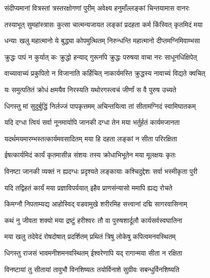 
\twolineshloka
{संदीप्यमानां वित्रस्तां त्रस्तरक्षोगणां पुरीम्}
{अवेक्ष्य हनुमाँल्लङ्कां चिन्तयामास वानरः} %

\twolineshloka
{तस्याभूत् सुमहांस्त्रासः कुत्सा चात्मन्यजायत}
{लङ्कां प्रदहता कर्म किंस्वित् कृतमिदं मया} %

\twolineshloka
{धन्याः खलु महात्मानो ये बुद्ध्या कोपमुत्थितम्}
{निरुन्धन्ति महात्मानो दीप्तमग्निमिवाम्भसा} %

\twolineshloka
{क्रुद्धः पापं न कुर्यात् कः क्रुद्धो हन्याद् गुरूनपि}
{क्रुद्धः परुषया वाचा नरः साधूनधिक्षिपेत्} %

\twolineshloka
{वाच्यावाच्यं प्रकुपितो न विजानाति कर्हिचित्}
{नाकार्यमस्ति क्रुद्धस्य नावाच्यं विद्यते क्वचित्} %

\twolineshloka
{यः समुत्पतितं क्रोधं क्षमयैव निरस्यति}
{यथोरगस्त्वचं जीर्णां स वै पुरुष उच्यते} %

\twolineshloka
{धिगस्तु मां सुदुर्बुद्धिं निर्लज्जं पापकृत्तमम्}
{अचिन्तयित्वा तां सीतामग्निदं स्वामिघातकम्} %

\twolineshloka
{यदि दग्धा त्वियं सर्वा नूनमार्यापि जानकी}
{दग्धा तेन मया भर्तुर्हतं कार्यमजानता} %

\twolineshloka
{यदर्थमयमारम्भस्तत्कार्यमवसादितम्}
{मया हि दहता लङ्कां न सीता परिरक्षिता} %

\twolineshloka
{ईषत्कार्यमिदं कार्यं कृतमासीन्न संशयः}
{तस्य क्रोधाभिभूतेन मया मूलक्षयः कृतः} %

\twolineshloka
{विनष्टा जानकी व्यक्तं न ह्यदग्धः प्रदृश्यते}
{लङ्कायाः कश्चिदुद्देशः सर्वा भस्मीकृता पुरी} %

\twolineshloka
{यदि तद्विहतं कार्यं मया प्रज्ञाविपर्ययात्}
{इहैव प्राणसंन्यासो ममापि ह्यद्य रोचते} %

\twolineshloka
{किमग्नौ निपताम्यद्य आहोस्विद् वडवामुखे}
{शरीरमिह सत्त्वानां दद्मि सागरवासिनाम्} %

\twolineshloka
{कथं नु जीवता शक्यो मया द्रष्टुं हरीश्वरः}
{तौ वा पुरुषशार्दूलौ कार्यसर्वस्वघातिना} %

\twolineshloka
{मया खलु तदेवेदं रोषदोषात् प्रदर्शितम्}
{प्रथितं त्रिषु लोकेषु कपित्वमनवस्थितम्} %

\twolineshloka
{धिगस्तु राजसं भावमनीशमनवस्थितम्}
{ईश्वरेणापि यद् रागान्मया सीता न रक्षिता} %

\twolineshloka
{विनष्टायां तु सीतायां तावुभौ विनशिष्यतः}
{तयोर्विनाशे सुग्रीवः सबन्धुर्विनशिष्यति} %

